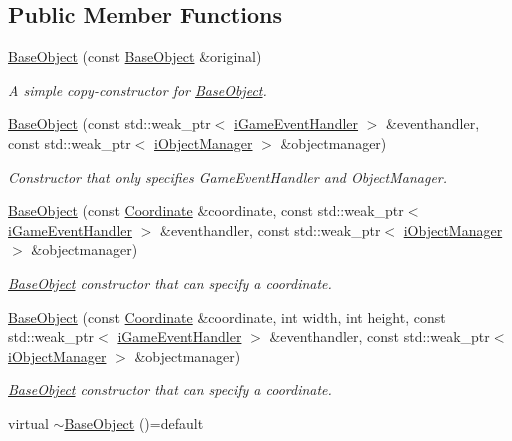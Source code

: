 \subsection*{Public Member Functions}
\begin{DoxyCompactItemize}
\item 
\hyperlink{class_course_1_1_base_object_a168cc0b164c2f99f991da655109f7627}{Base\-Object} (const \hyperlink{class_course_1_1_base_object}{Base\-Object} \&original)
\begin{DoxyCompactList}\small\item\em A simple copy-\/constructor for \hyperlink{class_course_1_1_base_object}{Base\-Object}. \end{DoxyCompactList}\item 
\hyperlink{class_course_1_1_base_object_aab6723fcfe33897629b21eca2a81b55e}{Base\-Object} (const std\-::weak\-\_\-ptr$<$ \hyperlink{class_course_1_1i_game_event_handler}{i\-Game\-Event\-Handler} $>$ \&eventhandler, const std\-::weak\-\_\-ptr$<$ \hyperlink{class_course_1_1i_object_manager}{i\-Object\-Manager} $>$ \&objectmanager)
\begin{DoxyCompactList}\small\item\em Constructor that only specifies Game\-Event\-Handler and Object\-Manager. \end{DoxyCompactList}\item 
\hyperlink{class_course_1_1_base_object_a3da1023281979736d2067b32505baae7}{Base\-Object} (const \hyperlink{class_course_1_1_coordinate}{Coordinate} \&coordinate, const std\-::weak\-\_\-ptr$<$ \hyperlink{class_course_1_1i_game_event_handler}{i\-Game\-Event\-Handler} $>$ \&eventhandler, const std\-::weak\-\_\-ptr$<$ \hyperlink{class_course_1_1i_object_manager}{i\-Object\-Manager} $>$ \&objectmanager)
\begin{DoxyCompactList}\small\item\em \hyperlink{class_course_1_1_base_object}{Base\-Object} constructor that can specify a coordinate. \end{DoxyCompactList}\item 
\hyperlink{class_course_1_1_base_object_a6f7d78dba33cc7607acb82136bffa3f1}{Base\-Object} (const \hyperlink{class_course_1_1_coordinate}{Coordinate} \&coordinate, int width, int height, const std\-::weak\-\_\-ptr$<$ \hyperlink{class_course_1_1i_game_event_handler}{i\-Game\-Event\-Handler} $>$ \&eventhandler, const std\-::weak\-\_\-ptr$<$ \hyperlink{class_course_1_1i_object_manager}{i\-Object\-Manager} $>$ \&objectmanager)
\begin{DoxyCompactList}\small\item\em \hyperlink{class_course_1_1_base_object}{Base\-Object} constructor that can specify a coordinate. \end{DoxyCompactList}\item 
\hypertarget{class_course_1_1_base_object_a8a1c9593ebfdb31983b99d22b1ab94bb}{virtual \hyperlink{class_course_1_1_base_object_a8a1c9593ebfdb31983b99d22b1ab94bb}{$\sim$\-Base\-Object} ()=default}\label{class_course_1_1_base_object_a8a1c9593ebfdb31983b99d22b1ab94bb}


\end{DoxyCompactItemize}
